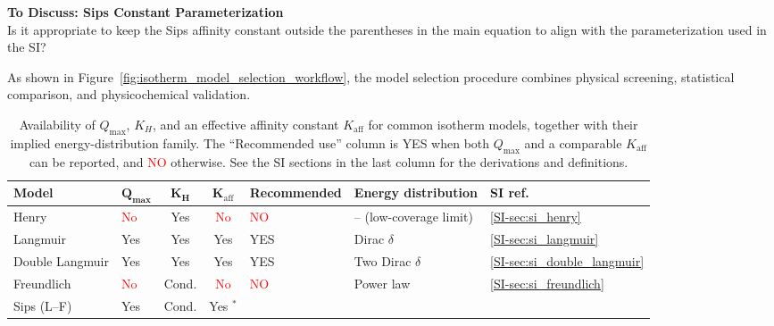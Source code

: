 \documentclass[journal=jacsat,manuscript=article]{achemso}
\begin{document}
	\begin{mdframed}
	\noindent\textbf{To Discuss: Sips Constant Parameterization} \\
	Is it appropriate to keep the Sips affinity constant outside the parentheses in the main equation to align with the parameterization used in the SI?
	\end{mdframed}
	
	As shown in Figure~\ref{fig:isotherm_model_selection_workflow}, the model selection procedure combines physical screening, statistical comparison, and physicochemical validation.
	
	\newpage

	\begin{table}[H]
		\small
		\caption{Availability of $Q_{\max}$, $K_H$, and an effective affinity constant $K_{\mathrm{aff}}$ for common isotherm models, together with their implied energy-distribution family. The ``Recommended use'' column is \textcolor{green!50!black}{YES} when both $Q_{\max}$ and a comparable $K_{\mathrm{aff}}$ can be reported, and \textcolor{red}{NO} otherwise. See the SI sections in the last column for the derivations and definitions.}
		\label{tab:isotherm_availability}
		\renewcommand{\arraystretch}{1.2}
		\begin{tabular}{@{} p{2.0cm} p{1.0cm} c c p{3.0cm} p{3.8cm} p{1.8cm} @{}}
			\hline
			\textbf{Model}
			& $\boldsymbol{Q_{\max}}$
			& $\boldsymbol{K_H}$
			& $\boldsymbol{K_{\mathrm{aff}}}$
			& \textbf{Recommended}
			& \textbf{Energy distribution}
			& \textbf{SI ref.} \\
			\hline
			Henry
			& \textcolor{red}{No} & \textcolor{green!50!black}{Yes} & \textcolor{red}{No}
			& \textcolor{red}{NO}
			& -- (low-coverage limit)
			& \ref{SI-sec:si_henry} \\
			Langmuir
			& \textcolor{green!50!black}{Yes} & \textcolor{green!50!black}{Yes} & \textcolor{green!50!black}{Yes}
			& \textcolor{green!50!black}{YES}
			& Dirac $\delta$
			& \ref{SI-sec:si_langmuir} \\
			Double Langmuir
			& \textcolor{green!50!black}{Yes} & \textcolor{green!50!black}{Yes} & \textcolor{green!50!black}{Yes}
			& \textcolor{green!50!black}{YES}
			& Two Dirac $\delta$
			& \ref{SI-sec:si_double_langmuir} \\
			Freundlich
			& \textcolor{red}{No} & \textcolor{orange!80!black}{Cond.} & \textcolor{red}{No}
			& \textcolor{red}{NO}
			& Power law %
			& \ref{SI-sec:si_freundlich} \\
			Sips (L--F)
			& \textcolor{green!50!black}{Yes} & \textcolor{orange!80!black}{Cond.} & \textcolor{green!50!black}{Yes} $^*$

\end{tabular}
\end{table}
\end{document}
